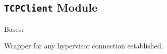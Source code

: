 \documentclass[letterpaper,10pt,english]{sphinxmanual}
\begin{document}
\subsection{\texttt{TCPClient} Module}
\label{ref-manual/XrdTest:tcpclient-module}\label{ref-manual/XrdTest:module-XrdTest.TCPClient}

\begin{fulllineitems}
\label{ref-manual/XrdTest:XrdTest.TCPClient.Hypervisor}
Bases: {\hyperref[ref-manual/XrdTest:XrdTest.TCPClient.TCPClient]{}}

Wrapper for any hypervisor connection established.

\end{fulllineitems}

\end{document}
